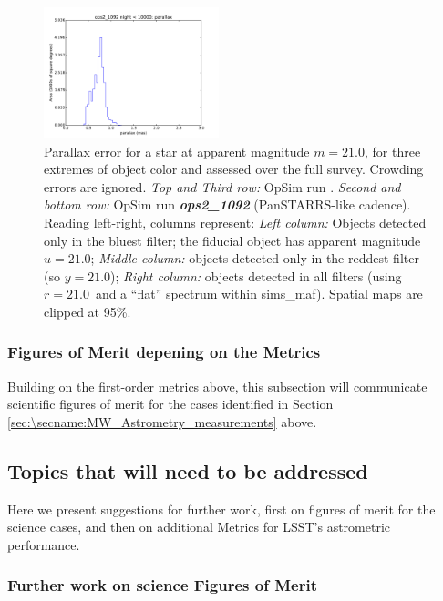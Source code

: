 \begin{figure}[ht]
\begin{center}
  \includegraphics[width=2.0in]{./figs/milkyway/MW_Astrom_paError_1092_10y_hst.pdf}
  \end{center}
  \caption{Parallax error for a star at apparent magnitude $m=21.0$, for three extremes of object color and assessed over the full survey. Crowding errors are ignored. {\it Top and Third row:} OpSim run . {\it Second and bottom row:} OpSim run {\it \bf ops2\_1092} (PanSTARRS-like cadence). Reading left-right, columns represent: {\it Left column:} Objects detected only in the bluest filter; the fiducial object has apparent magnitude $u=21.0$; {\it Middle column:} objects detected only in the reddest filter (so $y = 21.0$); {\it Right column:} objects detected in all filters (using $r=21.0$~and a ``flat'' spectrum within sims\_maf). Spatial maps are clipped at 95\%.}
  \label{fig_astrom_ByFilter_paError}
\end{figure}

\subsubsection{Figures of Merit depening on the Metrics}

Building on the first-order metrics above, this subsection will communicate scientific figures of merit for the cases identified in Section \ref{sec:\secname:MW_Astrometry_measurements} above.


\subsection{Topics that will need to be addressed}
\label{sec:\secname:MW_Astrometry_furtherwork}

Here we present suggestions for further work, first on figures of
merit for the science cases, and then on additional Metrics for LSST's
astrometric performance.

\subsubsection{Further work on science Figures of Merit}

